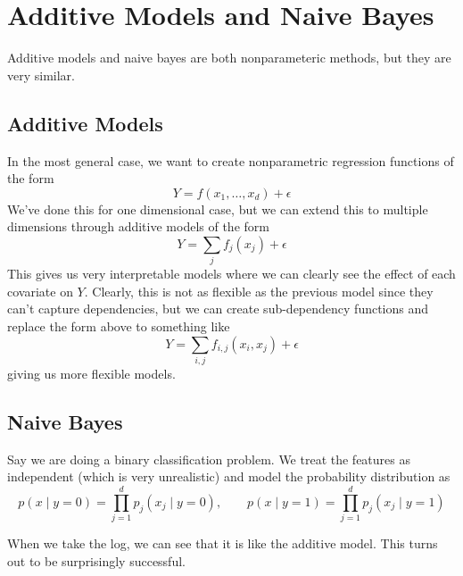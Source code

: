 \section{Additive Models and Naive Bayes}

  Additive models and naive bayes are both nonparameteric methods, but they are very similar. 

\subsection{Additive Models}

  In the most general case, we want to create nonparametric regression functions of the form 
  \begin{equation}
    Y = f(x_1, \ldots, x_d) + \epsilon 
  \end{equation}
  We've done this for one dimensional case, but we can extend this to multiple dimensions through additive models of the form 
  \begin{equation}
    Y = \sum_j f_j (x_j)  + \epsilon
  \end{equation}
  This gives us very interpretable models where we can clearly see the effect of each covariate on $Y$. Clearly, this is not as flexible as the previous model since they can't capture dependencies, but we can create sub-dependency functions and replace the form above to something like 
  \begin{equation}
    Y = \sum_{i, j} f_{i, j} (x_i, x_j) + \epsilon
  \end{equation}
  giving us more flexible models. 

\subsection{Naive Bayes} 

  Say we are doing a binary classification problem. We treat the features as independent (which is very unrealistic) and model the probability distribution as 
  \begin{equation}
    p(x \mid y = 0) = \prod_{j=1}^d p_j (x_j \mid y = 0), \qquad p(x \mid y = 1) = \prod_{j=1}^d p_j (x_j \mid y = 1)
  \end{equation}

  When we take the log, we can see that it is like the additive model. This turns out to be surprisingly successful. 
